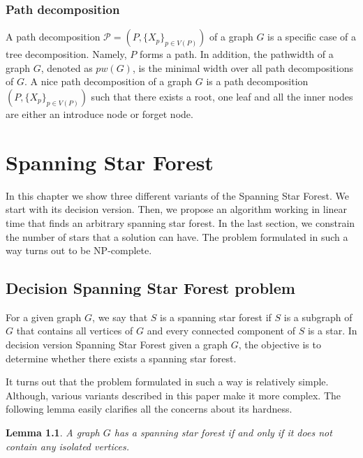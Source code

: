 \documentclass[en]{pracamgr}
\newtheorem{lemma}{Lemma}
\newcommand{\ssf}{spanning star forest}
\newcommand{\ssfp}{{\sc Spanning Star Forest}}
\begin{document}
\subsection{Path decomposition}

A path decomposition $\mathcal{P}=(P,\{X_p\}_{p \in V(P)})$ of a graph $G$ is a specific case of a tree decomposition. Namely, $P$ forms a path. In addition, the pathwidth of a graph $G$, denoted as $pw(G)$, is the minimal width over all path decompositions of $G$. A nice path decomposition of a graph $G$ is a path decomposition $(P,\{X_p\}_{p \in V(P)})$ such that there exists a root, one leaf and all the inner nodes are either an introduce node or forget node.

\chapter{Spanning Star Forest}\label{r:losers}

In this chapter we show three different variants of the \ssfp{}. We start with its decision version. Then, we propose an algorithm working in linear time that finds an arbitrary \ssf{}. In the last section, we constrain the number of stars that a solution can have. The problem formulated in such a way turns out to be NP-complete.

\section{Decision Spanning Star Forest problem}

For a given graph $G$, we say that $S$ is a \ssf{} if $S$ is a subgraph of $G$ that contains all vertices of $G$ and every connected component of $S$ is a star. In decision version \ssfp{} given a graph $G$, the objective is to determine whether there exists a \ssf{}.

It turns out that the problem formulated in such a way is relatively simple. Although, various variants described in this paper make it more complex. The following lemma easily clarifies all the concerns about its hardness.

\begin{lemma}\label{SSF lemma}
 A graph $G$ has a \ssf{} if and only if it does not contain any isolated vertices.
\end{lemma}
\end{document}
